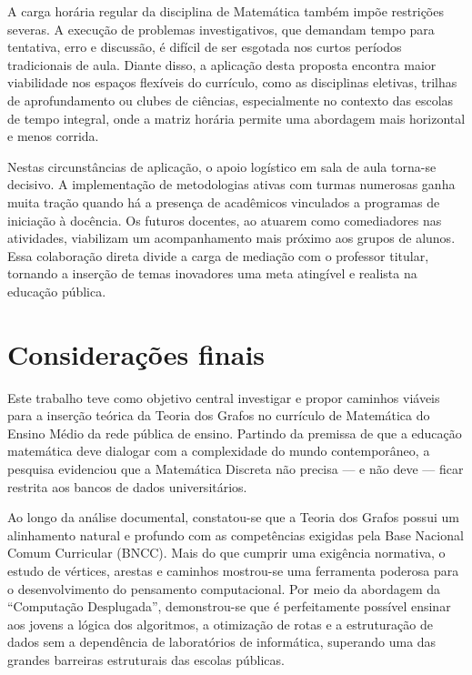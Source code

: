 \documentclass[
  12pt,
  oneside,
  a4paper,
  english,
  brazilian
  ]{abntex2}
\theoremstyle{definition}
\begin{document}
A carga horária regular da disciplina de Matemática também impõe restrições severas. A execução de problemas investigativos, que demandam tempo para tentativa, erro e discussão, é difícil de ser esgotada nos curtos períodos tradicionais de aula. Diante disso, a aplicação desta proposta encontra maior viabilidade nos espaços flexíveis do currículo, como as disciplinas eletivas, trilhas de aprofundamento ou clubes de ciências, especialmente no contexto das escolas de tempo integral, onde a matriz horária permite uma abordagem mais horizontal e menos corrida.

Nestas circunstâncias de aplicação, o apoio logístico em sala de aula torna-se decisivo. A implementação de metodologias ativas com turmas numerosas ganha muita tração quando há a presença de acadêmicos vinculados a programas de iniciação à docência. Os futuros docentes, ao atuarem como comediadores nas atividades, viabilizam um acompanhamento mais próximo aos grupos de alunos. Essa colaboração direta divide a carga de mediação com o professor titular, tornando a inserção de temas inovadores uma meta atingível e realista na educação pública.

\chapter{Considerações finais}


Este trabalho teve como objetivo central investigar e propor caminhos viáveis para a inserção teórica da Teoria dos Grafos no currículo de Matemática do Ensino Médio da rede pública de ensino. Partindo da premissa de que a educação matemática deve dialogar com a complexidade do mundo contemporâneo, a pesquisa evidenciou que a Matemática Discreta não precisa --- e não deve --- ficar restrita aos bancos de dados universitários.

Ao longo da análise documental, constatou-se que a Teoria dos Grafos possui um alinhamento natural e profundo com as competências exigidas pela Base Nacional Comum Curricular (BNCC). Mais do que cumprir uma exigência normativa, o estudo de vértices, arestas e caminhos mostrou-se uma ferramenta poderosa para o desenvolvimento do pensamento computacional. Por meio da abordagem da ``Computação Desplugada'', demonstrou-se que é perfeitamente possível ensinar aos jovens a lógica dos algoritmos, a otimização de rotas e a estruturação de dados sem a dependência de laboratórios de informática, superando uma das grandes barreiras estruturais das escolas públicas.
\end{document}

